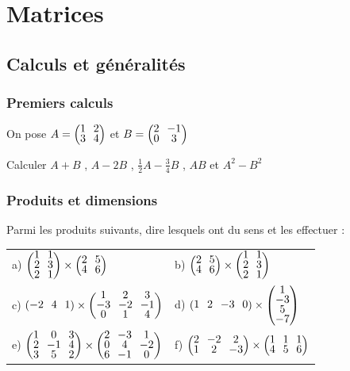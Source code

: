 \documentclass[oneside,12pt]{book}          %
\begin{document}
\chapter{Matrices}
\newpage


\section{Calculs et généralités}

\subsection{Premiers calculs}
On pose $A=\matrice{1&2\\3&4}$ et $B=\matrice{2&-1\\0&3}$

Calculer $A+B$ , $A-2B$ , $\frac{1}{2}A-\frac{3}{4}B$ , $AB$ et $A^2-B^2$



\subsection{Produits et dimensions}
Parmi les produits suivants, dire lesquels ont du sens et les effectuer : \\

\begin{tabular}{p{} p{}}
    a) $\matrice{1&1\\2&3\\2&1}\times\matrice{2&5\\4&6} $ &
    b) $\matrice{2&5\\4&6}\times\matrice{1&1\\2&3\\2&1} $ \\
    c) $\matrice{-2&4&1}\times\matrice{1&2&3\\-3&-2&-1\\0&1&4} $ &
    d) $\matrice{1&2&-3&0}\times\matrice{1\\-3\\5\\-7} $ \\
    e) $\matrice{1&0&3\\2&-1&4\\3&5&2}\times\matrice{2&-3&1\\0&4&-2\\6&-1&0} $ &
    f) $\matrice{2&-2&2\\1&2&-3}\times\matrice{1&1&1\\4&5&6} $
\end{tabular}
\end{document}
